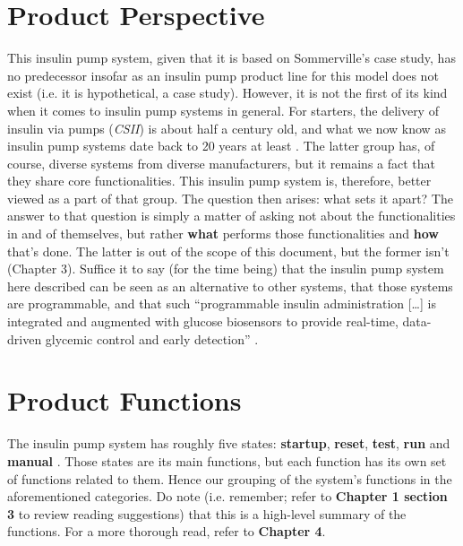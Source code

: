 \documentclass{scrreprt}
\begin{document}
\section{Product Perspective}
This insulin pump system, given that it is based on Sommerville's case study, has no predecessor insofar as an insulin pump product line for this model does not exist (i.e. it is hypothetical, a case study). 
However, it is not the first of its kind when it comes to insulin pump systems in general. For starters, the delivery of \gls{insulin} via pumps (\textsl{CSII}) is about half a century old, and what we now know as insulin pump 
systems date back to 20 years at least \cite{madamsvi}. The latter group has, of course, diverse systems from diverse manufacturers, but it remains a fact that they share core functionalities. This insulin pump system is,
therefore, better viewed as a part of that group. The question then arises: what sets it apart?  The answer to that question is simply a matter of asking not about the functionalities in and of themselves, but rather 
\textbf{what} performs those functionalities and \textbf{how} that's done. The latter is out of the scope of this document, but the former isn't (Chapter 3). Suffice it to say (for the time being) that the insulin pump 
system here described can be seen as an alternative to other systems, that those systems are programmable, and that such “programmable insulin administration [\ldots] is integrated and augmented with \gls{glucose} biosensors
to provide real-time, data-driven glycemic control and early detection” \cite{madamsvi}.

\section{Product Functions}
The insulin pump system has roughly five states: \textbf{startup}, \textbf{reset}, \textbf{test}, \textbf{run} and \textbf{manual} \cite{sommerville}. Those states are its main functions, but each function has its own set
of functions related to them. Hence our grouping of the system's functions in the aforementioned categories. Do note (i.e. remember; refer to \textbf{Chapter 1 section 3} to review reading suggestions) that this is a 
high-level summary of the functions. For a more thorough read, refer to \textbf{Chapter 4}. 
\end{document}
